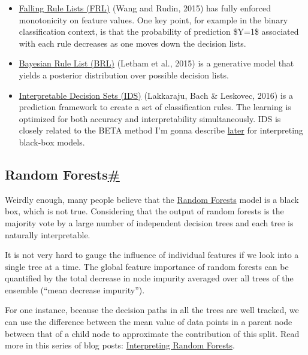 \begin{itemize}
\tightlist
\item
  \href{http://proceedings.mlr.press/v38/wang15a.pdf}{Falling Rule Lists (FRL)} (Wang and Rudin, 2015) has fully enforced monotonicity on feature values. One key point, for example in the binary classification context, is that the probability of prediction \$Y=1\$ associated with each rule decreases as one moves down the decision lists.
\item
  \href{https://arxiv.org/abs/1511.01644}{Bayesian Rule List (BRL)} (Letham et al., 2015) is a generative model that yields a posterior distribution over possible decision lists.
\item
  \href{https://cs.stanford.edu/people/jure/pubs/interpretable-kdd16.pdf}{Interpretable Decision Sets (IDS)} (Lakkaraju, Bach \& Leskovec, 2016) is a prediction framework to create a set of classification rules. The learning is optimized for both accuracy and interpretability simultaneously. IDS is closely related to the BETA method I'm gonna describe \href{https://lilianweng.github.io/posts/2017-08-01-interpretation/\#beta-black-box-explanation-through-transparent-approximations}{later} for interpreting black-box models.
\end{itemize}

\subsection{\texorpdfstring{Random Forests\hyperref[random-forests]{\#}}{Random Forests\#}}\label{random-forests}

Weirdly enough, many people believe that the \href{http://www.math.univ-toulouse.fr/~agarivie/Telecom/apprentissage/articles/randomforest2001.pdf}{Random Forests} model is a black box, which is not true. Considering that the output of random forests is the majority vote by a large number of independent decision trees and each tree is naturally interpretable.

It is not very hard to gauge the influence of individual features if we look into a single tree at a time. The global feature importance of random forests can be quantified by the total decrease in node impurity averaged over all trees of the ensemble (``mean decrease impurity'').

For one instance, because the decision paths in all the trees are well tracked, we can use the difference between the mean value of data points in a parent node between that of a child node to approximate the contribution of this split. Read more in this series of blog posts: \href{http://blog.datadive.net/interpreting-random-forests/}{Interpreting Random Forests}.

